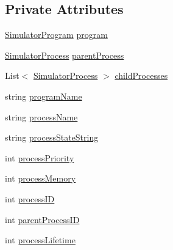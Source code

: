\subsection*{Private Attributes}
\begin{DoxyCompactItemize}
\item 
\hyperlink{class_c_p_u___o_s___simulator_1_1_c_p_u_1_1_simulator_program}{Simulator\+Program} \hyperlink{class_c_p_u___o_s___simulator_1_1_operating___system_1_1_simulator_process_aed4dc26a67cf9f15930f22941484219a}{program}
\item 
\hyperlink{class_c_p_u___o_s___simulator_1_1_operating___system_1_1_simulator_process}{Simulator\+Process} \hyperlink{class_c_p_u___o_s___simulator_1_1_operating___system_1_1_simulator_process_afd143112dcfa59dbc1cab80f65cf685f}{parent\+Process}
\item 
List$<$ \hyperlink{class_c_p_u___o_s___simulator_1_1_operating___system_1_1_simulator_process}{Simulator\+Process} $>$ \hyperlink{class_c_p_u___o_s___simulator_1_1_operating___system_1_1_simulator_process_a72edfc38a41a74a935147ea8039ea49c}{child\+Processes}
\item 
string \hyperlink{class_c_p_u___o_s___simulator_1_1_operating___system_1_1_simulator_process_aacd55b65bf86395ae3c1a446d580030e}{program\+Name}
\item 
string \hyperlink{class_c_p_u___o_s___simulator_1_1_operating___system_1_1_simulator_process_a6d29b67977f07ebb1b6336b96960752b}{process\+Name}
\item 
string \hyperlink{class_c_p_u___o_s___simulator_1_1_operating___system_1_1_simulator_process_a83b81537da37b145be64ae507734a67b}{process\+State\+String}
\item 
int \hyperlink{class_c_p_u___o_s___simulator_1_1_operating___system_1_1_simulator_process_a122acf698432625719c9ddd0152aab0d}{process\+Priority}
\item 
int \hyperlink{class_c_p_u___o_s___simulator_1_1_operating___system_1_1_simulator_process_af574b021e490c03ed55332ee0ed4c067}{process\+Memory}
\item 
int \hyperlink{class_c_p_u___o_s___simulator_1_1_operating___system_1_1_simulator_process_a1dc38ec3dc556cacd6de21a0ecd5e440}{process\+I\+D}
\item 
int \hyperlink{class_c_p_u___o_s___simulator_1_1_operating___system_1_1_simulator_process_af7c5460498b8fc188df0d4c12b62c15b}{parent\+Process\+I\+D}
\item 
int \hyperlink{class_c_p_u___o_s___simulator_1_1_operating___system_1_1_simulator_process_aa70f97b2b63f49ded3d505d104a1f3d9}{process\+Lifetime}

\end{DoxyCompactItemize}
